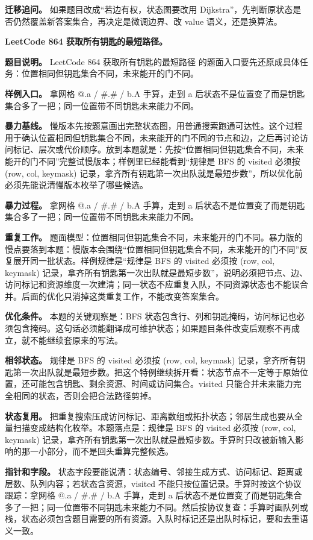 \textbf{迁移追问。} 如果题目改成“若边有权，状态图要改用 Dijkstra”，先判断原状态是否仍然覆盖新答案集合，再决定是微调边界、改 value 语义，还是换算法。

\noindent\textbf{LeetCode 864 获取所有钥匙的最短路径。}

\textbf{题目说明。} LeetCode 864 获取所有钥匙的最短路径 的题面入口要先还原成具体任务：位置相同但钥匙集合不同，未来能开的门不同。

\textbf{样例入口。} 拿网格 @.a / \#.\# / b.A 手算，走到 a 后状态不是位置变了而是钥匙集合多了一把；同一位置带不同钥匙未来能力不同。

\textbf{暴力基线。} 慢版本先按题意画出完整状态图，用普通搜索跑通可达性。这个过程用于确认位置相同但钥匙集合不同，未来能开的门不同的节点和边，之后再讨论访问标记、层次或代价顺序。放到本题就是：先按“位置相同但钥匙集合不同，未来能开的门不同”完整试慢版本；样例里已经能看到“规律是 BFS 的 visited 必须按 (row, col, keymask) 记录，拿齐所有钥匙第一次出队就是最短步数”，所以优化前必须先能说清慢版本枚举了哪些候选。

\textbf{暴力过程。} 拿网格 @.a / \#.\# / b.A 手算，走到 a 后状态不是位置变了而是钥匙集合多了一把；同一位置带不同钥匙未来能力不同。

\textbf{重复工作。} 题面模型：位置相同但钥匙集合不同，未来能开的门不同。暴力版的慢点要落到本题：慢版本会围绕“位置相同但钥匙集合不同，未来能开的门不同”反复展开同一批状态。样例规律是“规律是 BFS 的 visited 必须按 (row, col, keymask) 记录，拿齐所有钥匙第一次出队就是最短步数”，说明必须把节点、边、访问标记和资源维度一次建清；同一状态不应重复入队，不同资源状态也不能误合并。后面的优化只消掉这类重复工作，不能改变答案集合。

\textbf{优化条件。} 本题的关键观察是：BFS 状态包含行、列和钥匙掩码，访问标记也必须包含掩码。这句话必须能翻译成可维护状态；如果题目条件改变后观察不再成立，就不能继续套原来的写法。

\textbf{相邻状态。} 规律是 BFS 的 visited 必须按 (row, col, keymask) 记录，拿齐所有钥匙第一次出队就是最短步数。把这个特例继续拆开看：状态节点不一定等于原始位置，还可能包含钥匙、剩余资源、时间或访问集合。visited 只能合并未来能力完全相同的状态，否则会把合法路径剪掉。

\textbf{状态复用。} 把重复搜索压成访问标记、距离数组或拓扑状态；邻居生成也要从全量扫描变成结构化枚举。本题落点是：规律是 BFS 的 visited 必须按 (row, col, keymask) 记录，拿齐所有钥匙第一次出队就是最短步数。手算时只改被新输入影响的那一小部分，而不是回头重算完整候选。

\textbf{指针和字段。} 状态字段要能说清：状态编号、邻接生成方式、访问标记、距离或层数、队列内容；若状态含资源，visited 不能只按位置记录。手算时按这个协议跟踪：拿网格 @.a / \#.\# / b.A 手算，走到 a 后状态不是位置变了而是钥匙集合多了一把；同一位置带不同钥匙未来能力不同。然后按协议复查：手算时画队列或栈，状态必须包含题目需要的所有资源。入队时标记还是出队时标记，要和去重语义一致。

